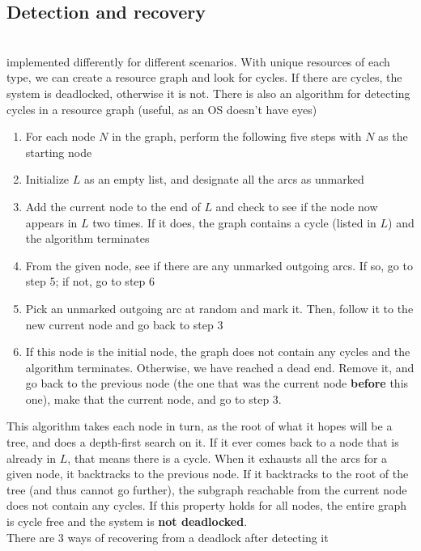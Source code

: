 \documentclass{article}
\begin{document}
\subsection*{Detection and recovery}
\\implemented differently for different scenarios. With unique resources of each type, we can create a resource graph and look for cycles. If there are cycles, the system is deadlocked, otherwise it is not. There is also an algorithm for detecting cycles in a resource graph (useful, as an OS doesn't have eyes)
\begin{enumerate}
	\item For each node $N$ in the graph, perform the following five steps with $N$ as the starting node
	\item Initialize $L$ as an empty list, and designate all the arcs as unmarked
	\item Add the current node to the end of $L$ and check to see if the node now appears in $L$ two times. If it does, the graph contains a cycle (listed in $L$) and the algorithm terminates
	\item From the given node, see if there are any unmarked outgoing arcs. If so, go to step 5; if not, go to step 6
	\item Pick an unmarked outgoing arc at random and mark it. Then, follow it to the new current node and go back to step 3
	\item If this node is the initial node, the graph does not contain any cycles and the algorithm terminates. Otherwise, we have reached a dead end. Remove it, and go back to the previous node (the one that was the current node \textbf{before} this one), make that the current node, and go to step 3.
\end{enumerate}
This algorithm takes each node in turn, as the root of what it hopes will be a tree, and does a depth-first search on it. If it ever comes back to a node that is already in $L$, that means there is a cycle. When it exhausts all the arcs for a given node, it backtracks to the previous node. If it backtracks to the root of the tree (and thus cannot go further), the subgraph reachable from the current node does not contain any cycles. If this property holds for all nodes, the entire graph is cycle free and the system is \textbf{not deadlocked}.
\\There are 3 ways of recovering from a deadlock after detecting it
\end{document}
